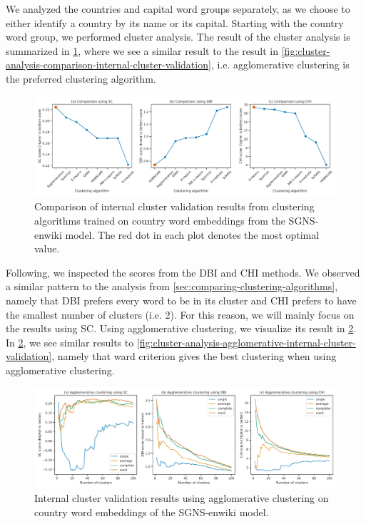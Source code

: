 We analyzed the countries and capital word groups separately, as we choose to either identify a country by its name or its capital. Starting with the country word group, we performed cluster analysis. The result of the cluster analysis is summarized in \cref{fig:cluster-analysis-country-word-group-internal-cluster-validation}, where we see a similar result to the result in \cref{fig:cluster-analysis-comparison-internal-cluster-validation}, i.e. agglomerative clustering is the preferred clustering algorithm.
\begin{figure}[H]
    \centering
    \includegraphics[width=\textwidth]{thesis/figures/cluster-analysis-country-word-group-internal-cluster-validation.pdf}
    \caption{Comparison of internal cluster validation results from clustering algorithms trained on country word embeddings from the SGNS-enwiki model. The red dot in each plot denotes the most optimal value.}
    \label{fig:cluster-analysis-country-word-group-internal-cluster-validation}
\end{figure}

Following, we inspected the scores from the DBI and CHI methods. We observed a similar pattern to the analysis from \cref{sec:comparing-clustering-algorithms}, namely that DBI prefers every word to be in its cluster and CHI prefers to have the smallest number of clusters (i.e. 2). For this reason, we will mainly focus on the results using SC. Using agglomerative clustering, we visualize its result in \cref{fig:cluster-analysis-agglomerative-country-word-group-internal-cluster-validation}. In \cref{fig:cluster-analysis-agglomerative-country-word-group-internal-cluster-validation}, we see similar results to \cref{fig:cluster-analysis-agglomerative-internal-cluster-validation}, namely that ward criterion gives the best clustering when using agglomerative clustering.
\begin{figure}[H]
    \centering
    \includegraphics[width=\textwidth]{thesis/figures/cluster-analysis-agglomerative-country-word-group-internal-cluster-validation.pdf}
    \caption{Internal cluster validation results using agglomerative clustering on country word embeddings of the SGNS-enwiki model.}
    \label{fig:cluster-analysis-agglomerative-country-word-group-internal-cluster-validation}
\end{figure}

